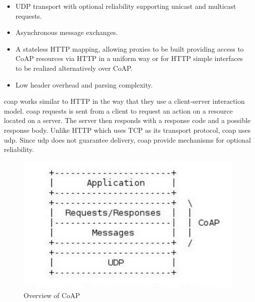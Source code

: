 \begin{itemize}

    \item UDP transport with optional reliability supporting unicast and
    multicast requests.

    \item Asynchronous message exchanges.

    \item A stateless HTTP mapping, allowing proxies to be built providing
    access to CoAP resources via HTTP in a uniform way or for HTTP simple
    interfaces to be realized alternatively over CoAP.

     \item Low header overhead and parsing complexity.

\end{itemize}

\gls{coap} works similar to HTTP in the way that they use a client-server
interaction model. \gls{coap} requests is sent from a client to request an
action on a resource located on a server. The server then responds with a
response code and a possible response body. Unlike HTTP which uses TCP as its
transport protocol, \gls{coap} uses \gls{udp}. Since \gls{udp} does not
guarantee delivery, \gls{coap} provide mechanisms for optional reliability.

\begin{figure}[h]
\centering
\includegraphics[scale=0.6]{images/coap.pdf}
\caption{Overview of CoAP}
\end{figure}


\subsection{}

